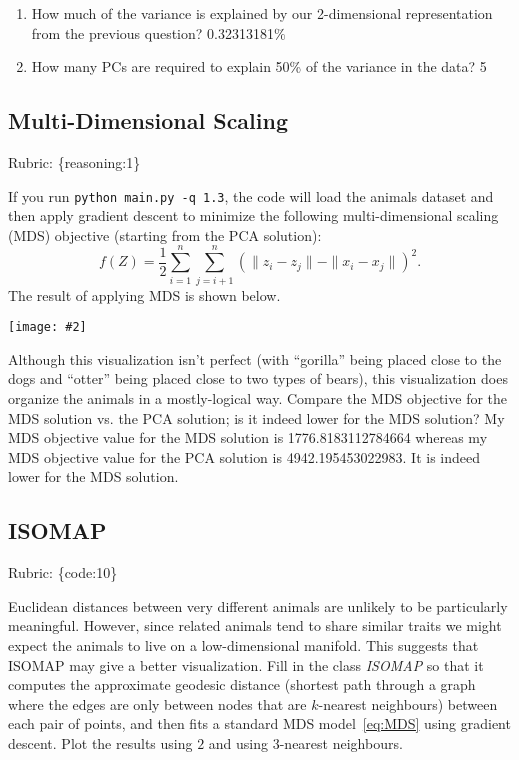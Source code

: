 \documentclass{article}
\def\rubric#1{\gre{Rubric: \{#1\}}}{}
\def\blu#1{{\color{blu}#1}}
\def\gre#1{{\color{gre}#1}}
\def\red#1{{\color{red}#1}}
\def\norm#1{\|#1\|}
\newcommand{\centerfig}[2]{\begin{center}\texttt{[image: \#2]}\end{center}}
\def\enum#1{\begin{enumerate}#1\end{enumerate}}
\begin{document}
\blu{\enum{
\item How much of the variance is explained by our 2-dimensional representation from the previous question?
\red{0.32313181$\%$}
\item How many PCs are required to explain 50\% of the variance in the data?
\red{5}
}}


\subsection{Multi-Dimensional Scaling}
\rubric{reasoning:1}

If you run \verb|python main.py -q 1.3|, the code will load the animals dataset and then apply gradient descent to minimize the following multi-dimensional scaling (MDS) objective (starting from the PCA solution):
\begin{equation}
\label{eq:MDS}
f(Z) =  \frac{1}{2}\sum_{i=1}^n\sum_{j=i+1}^n (  \norm{z_i - z_j} - \norm{x_i - x_j})^2.
\end{equation}
 The result of applying MDS is shown below.
\centerfig{.5}{./figs/MDS_animals.png}
Although this visualization isn't perfect (with ``gorilla'' being placed close to the dogs and ``otter'' being placed close to two types of bears), this visualization does organize the animals in a mostly-logical way.
\blu{Compare the MDS objective for the MDS solution vs. the PCA solution; is it indeed lower for the MDS solution?} 
\red{My MDS objective value for the MDS solution is 1776.8183112784664 whereas my MDS objective value for the PCA solution is  4942.195453022983. It is indeed lower for the MDS solution.}

\subsection{ISOMAP}
\rubric{code:10}

Euclidean distances between very different animals are unlikely to be particularly meaningful.
However, since related animals tend to share similar traits we might expect the animals to live on a low-dimensional manifold.
This suggests that ISOMAP may give a better visualization.
Fill in the class \emph{ISOMAP} so that it computes the approximate geodesic distance
(shortest path through a graph where the edges are only between nodes that are $k$-nearest neighbours) between each pair of points,
and then fits a standard MDS model~\eqref{eq:MDS} using gradient descent. \blu{Plot the results using $2$ and using $3$-nearest neighbours}.
\end{document}

